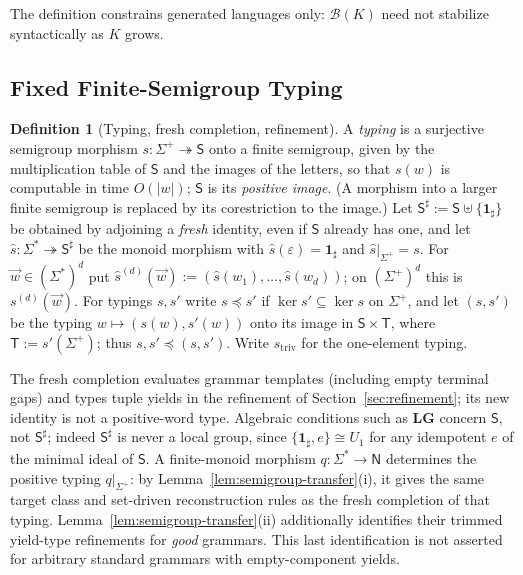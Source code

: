 \documentclass[11pt]{article}
\numberwithin{equation}{section}
\theoremstyle{plain}
\theoremstyle{definition}
\newtheorem{definition}[theorem]{Definition}
\theoremstyle{remark}
\newcommand{\tuple}[1]{\vec{#1}}
\newcommand{\eps}{\varepsilon}
\theoremstyle{plain}
\begin{document}
The definition constrains generated languages only: $\mathcal B(K)$ need not
stabilize syntactically as $K$ grows.

\subsection{Fixed Finite-Semigroup Typing}
\label{subsec:semigroup-typing}

\begin{definition}[Typing, fresh completion, refinement]
\label{def-monoid-morphism}
\label{def:semigroup-typing}
\label{def:h-refinement}
A \emph{typing} is a surjective semigroup morphism
$s:\Sigma^+\twoheadrightarrow\mathsf S$ onto a finite semigroup, given by the
multiplication table of $\mathsf S$ and the images of the letters, so that
$s(w)$ is computable in time $O(|w|)$; $\mathsf S$ is its \emph{positive
image}.  (A morphism into a larger finite semigroup is replaced by its
corestriction to the image.)  Let $\mathsf S^\sharp:=\mathsf
S\uplus\{\mathbf1_\sharp\}$ be obtained by adjoining a \emph{fresh} identity,
even if $\mathsf S$ already has one, and let
$\widehat{s}:\Sigma^*\twoheadrightarrow\mathsf S^\sharp$ be the monoid morphism
with $\widehat{s}(\eps)=\mathbf1_\sharp$ and $\widehat{s}|_{\Sigma^+}=s$.  For
$\tuple w\in(\Sigma^*)^d$ put
$\widehat{s}^{(d)}(\tuple w):=(\widehat{s}(w_1),\ldots,\widehat{s}(w_d))$; on
$(\Sigma^+)^d$ this is $s^{(d)}(\tuple w)$.  For typings $s,s'$ write $s\preceq
s'$ if $\ker s'\subseteq\ker s$ on $\Sigma^+$, and let $(s,s')$ be the typing
$w\mapsto(s(w),s'(w))$ onto its image in $\mathsf S\times\mathsf T$, where $\mathsf T:=s'(\Sigma^+)$; thus
$s,s'\preceq(s,s')$.  Write $s_{\mathrm{triv}}$ for the one-element typing.
\end{definition}

The fresh completion evaluates grammar templates (including empty
terminal gaps) and types tuple yields in the refinement of
Section~\ref{sec:refinement}; its new identity is not a positive-word type.
Algebraic conditions such as $\mathbf{LG}$ concern $\mathsf S$, not
$\mathsf S^\sharp$; indeed $\mathsf S^\sharp$ is never a local group, since
$\{\mathbf1_\sharp,e\}\cong U_1$ for any idempotent $e$ of the minimal ideal of $\mathsf S$.  A finite-monoid morphism $q:\Sigma^*\to\mathsf N$ determines
the positive typing $q|_{\Sigma^+}$: by
Lemma~\ref{lem:semigroup-transfer}(i), it gives the same target class and
set-driven reconstruction rules as the fresh completion of that typing.
Lemma~\ref{lem:semigroup-transfer}(ii) additionally identifies their
trimmed yield-type refinements for \emph{good} grammars.  This last
identification is not asserted for arbitrary standard grammars with
empty-component yields.
\end{document}
